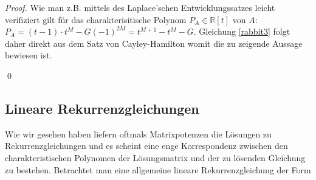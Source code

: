 \documentclass{article}
\theoremstyle{plain} %
\theoremstyle{definition} %
\newtheorem{proof}[theorem]{Beweis}
\begin{document}
\begin{proof}
  Wie man z.B. mittels des Laplace'schen Entwicklungssatzes leicht verifiziert gilt für das charakterisitische Polynom $P_A \in \mathbb{R}[t]$ von $A$: $P_A = (t - 1) \cdot t^M - G (-1)^{2M} = t^{M+1} - t^M - G$. Gleichung \ref{rabbit3} folgt daher direkt aus dem Satz von Cayley-Hamilton\cite[S. 109]{LiesenMehrmann} womit die zu zeigende Aussage bewiesen ist.

  \qed
\end{proof}

\subsection{Lineare Rekurrenzgleichungen}

Wie wir gesehen haben liefern oftmals Matrixpotenzen die Lösungen zu Rekurrenzgleichungen und es scheint eine enge Korrespondenz zwischen den charakteristischen Polynomen der Lösungsmatrix und der zu lösenden Gleichung zu bestehen. Betrachtet man eine allgemeine lineare Rekurrenzgleichung der Form
\end{document}
